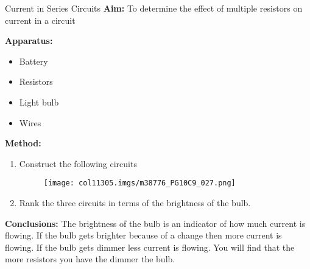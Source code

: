             \begin{i_experiment}{Current in Series Circuits}
            \nopagebreak
            \label{m38776*id66871}\noindent{}\textbf{Aim:}
          To determine the effect of multiple resistors on current in a circuit\par 
        \label{m38776*id66886}\noindent{}\textbf{Apparatus:}
        \label{m38776*id66895}\begin{itemize}[noitemsep]
            \label{m38776*uid49}\item Battery
\label{m38776*uid50}\item Resistors
\label{m38776*uid51}\item Light bulb
\label{m38776*uid52}\item Wires
\end{itemize}
        \par 
        \label{m38776*id66948}\noindent{}\textbf{Method:}
        \label{m38776*id66957}\begin{enumerate}[noitemsep, label=\textbf{\arabic*}. ] 
            \label{m38776*uid53}\item Construct the following circuits
    \setcounter{subfigure}{0}
	\begin{figure}[H] %
    \begin{center}
    \label{m38776*id66976!!!underscore!!!media}\label{m38776*id66976!!!underscore!!!printimage}\texttt{[image: col11305.imgs/m38776\_PG10C9\_027.png]} %
      \vspace{2pt}
    \vspace{.1in}
    \end{center}
 \end{figure}       \label{m38776*uid54}\item Rank the three circuits in terms of the brightness of the bulb.
\end{enumerate}
        \par 
        \label{m38776*id66996}\noindent{}\textbf{Conclusions:}
        The brightness of the bulb is an indicator of how much current is flowing. If the bulb gets brighter because of a change then more current is flowing. If the bulb gets dimmer less current is flowing.
You will find that the more resistors you have the dimmer the bulb.
 \par 
 \end{i_experiment}
\label{m38776*secfhsst!!!underscore!!!id903}\vspace{.5cm} 
      \noindent
